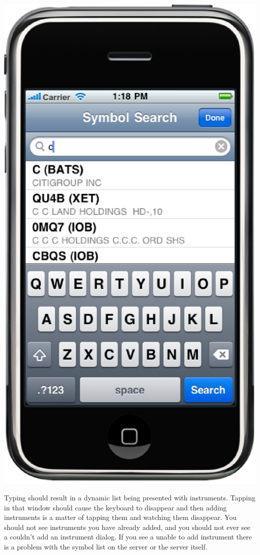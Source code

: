 \documentclass[12pt,twoside,letterpaper]{report}
\begin{document}
\includegraphics[scale=0.5]{symbolSearch}

Typing should result in a dynamic list being presented with instruments. Tapping in that window should cause the keyboard to disappear and then adding instruments is a matter of tapping them and watching them disappear. You should not see instruments you have already added, and you should not ever see a couldn't add an instrument dialog. If you see a unable to add instrument there is a problem with the symbol list on the server or the server itself.
\end{document}
